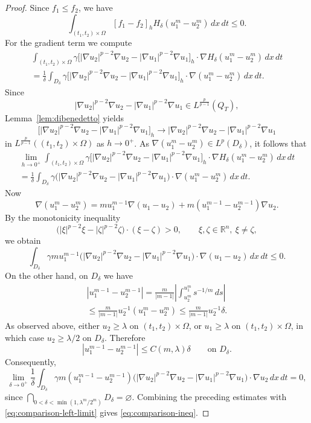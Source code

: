 \documentclass[a4paper,12pt]{article}
\theoremstyle{definition}
\theoremstyle{remark}
\begin{document}
\begin{proof}
Since $f_1\le f_2$, we have
\[
\int_{(t_1,t_2)\times\Omega}[f_1-f_2]_hH_\delta(u_1^m-u_2^m)\,dx\,dt\le 0.
\]
For the gradient term we compute
\begin{multline}
\int_{(t_1,t_2)\times\Omega}\gamma\bigl[|\nabla u_2|^{p-2}\nabla u_2-|\nabla u_1|^{p-2}\nabla u_1\bigr]_h\cdot\nabla H_\delta(u_1^m-u_2^m)\,dx\,dt\\
=\frac{1}{\delta}\int_{D_\delta}\gamma\bigl[|\nabla u_2|^{p-2}\nabla u_2-|\nabla u_1|^{p-2}\nabla u_1\bigr]_h\cdot\nabla(u_1^m-u_2^m)\,dx\,dt.
\end{multline}
Since
\[
|\nabla u_2|^{p-2}\nabla u_2-|\nabla u_1|^{p-2}\nabla u_1\in L^{\frac{p}{p-1}}(Q_T),
\]
Lemma~\ref{lem:dibenedetto} yields
\[
\bigl[|\nabla u_2|^{p-2}\nabla u_2-|\nabla u_1|^{p-2}\nabla u_1\bigr]_h
\to |\nabla u_2|^{p-2}\nabla u_2-|\nabla u_1|^{p-2}\nabla u_1
\]
in $L^{\frac{p}{p-1}}((t_1,t_2)\times\Omega)$ as $h\to0^+$. As $\nabla(u_1^m-u_2^m)\in L^p(D_\delta)$, it follows that
\begin{multline}
\lim_{h\to0^+}\int_{(t_1,t_2)\times\Omega}\gamma\bigl[|\nabla u_2|^{p-2}\nabla u_2-|\nabla u_1|^{p-2}\nabla u_1\bigr]_h\cdot\nabla H_\delta(u_1^m-u_2^m)\,dx\,dt\\
=\frac{1}{\delta}\int_{D_\delta}\gamma\bigl(|\nabla u_2|^{p-2}\nabla u_2-|\nabla u_1|^{p-2}\nabla u_1\bigr)\cdot\nabla(u_1^m-u_2^m)\,dx\,dt.
\end{multline}
Now
\[
\nabla(u_1^m-u_2^m)=m u_1^{m-1}\nabla(u_1-u_2)+m(u_1^{m-1}-u_2^{m-1})\nabla u_2.
\]
By the monotonicity inequality
\[
\bigl(|\xi|^{p-2}\xi-|\zeta|^{p-2}\zeta\bigr)\cdot(\xi-\zeta)>0,
\qquad \xi,\zeta\in\mathbb R^n,\ \xi\neq\zeta,
\]
we obtain
\[
\int_{D_\delta}\gamma m u_1^{m-1}\bigl(|\nabla u_2|^{p-2}\nabla u_2-|\nabla u_1|^{p-2}\nabla u_1\bigr)\cdot\nabla(u_1-u_2)\,dx\,dt\le 0.
\]
On the other hand, on $D_\delta$ we have
\begin{multline}
|u_1^{m-1}-u_2^{m-1}|=\frac{m}{|m-1|}\left|\int_{u_2^m}^{u_1^m}s^{-1/m}\,ds\right|\\
\le \frac{m}{|m-1|}u_2^{-1}(u_1^m-u_2^m)\le \frac{m}{|m-1|}u_2^{-1}\delta.
\end{multline}
As observed above, either $u_2\ge \lambda$ on $(t_1,t_2)\times\Omega$, or $u_1\ge \lambda$ on $(t_1,t_2)\times\Omega$, in which case $u_2\ge \lambda/2$ on $D_\delta$. Therefore
\[
|u_1^{m-1}-u_2^{m-1}|\le C(m,\lambda)\delta
\qquad\text{on }D_\delta.
\]
Consequently,
\[
\lim_{\delta\to0^+}\frac{1}{\delta}\int_{D_\delta}\gamma m (u_1^{m-1}-u_2^{m-1}) \bigl(|\nabla u_2|^{p-2}\nabla u_2-|\nabla u_1|^{p-2}\nabla u_1\bigr)\cdot\nabla u_2\,dx\,dt=0,
\]
since $\bigcap_{0<\delta<\min(1,\lambda^m/2^m)}D_\delta=\varnothing$. Combining the preceding estimates with \eqref{eq:comparison-left-limit} gives \eqref{eq:comparison-ineq}.
\end{proof}
\end{document}

